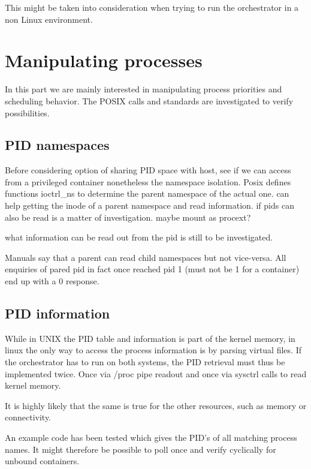 \documentclass[]{scrartcl}
\begin{document}
This might be taken into consideration when trying to run the orchestrator in a non Linux environment.


\section{Manipulating processes}

In this part we are mainly interested in manipulating process priorities and scheduling behavior. 
The POSIX calls and standards are investigated to verify possibilities.

\subsection{PID namespaces}

Before considering option of sharing PID space with host, see if we can access from a privileged container nonetheless the namespace isolation. 
Posix defines functions ioctrl\_ns to determine the parent namespace of the actual one. can help getting the inode of a parent namespace and read information. 
if pids can also be read is a matter of investigation. maybe mount as \/procext?

what information can be read out from the pid is still to be investigated.

Manuals say that a parent can read child namespaces but not vice-versa. All enquiries of pared pid in fact once reached pid 1 (must not be 1 for a container) end up with a 0 response.

\subsection{PID information}
\label{sub:pidinf}

While in UNIX the PID table and information is part of the kernel memory, in linux the only way to access the process information is by parsing virtual files. 
If the orchestrator has to run on both systems, the PID retrieval must thus be implemented twice. Once via /proc pipe readout and once via sysctrl calls to read kernel memory.

It is highly likely that the same is true for the other resources, such as memory or connectivity. 

An example code has been tested which gives the PID's of all matching process names. 
It might therefore be possible to poll once and verify cyclically for unbound containers. 
\end{document}
